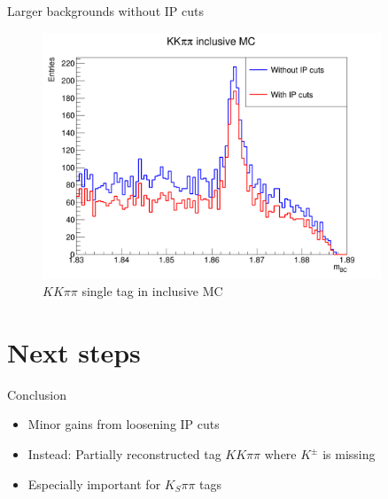 \documentclass{beamer}
\begin{document}
\begin{frame}{Larger backgrounds without IP cuts}
  \begin{figure}
    \centering
    \includegraphics[width=0.9\textwidth]{Plots/InclusiveMC_IPcuts.png}
    \caption{$KK\pi\pi$ single tag in inclusive MC}
  \end{figure}
\end{frame}

\section{Next steps}
\begin{frame}{Conclusion}
  \begin{itemize}
    \setlength\itemsep{1.5em}
    \item{Minor gains from loosening IP cuts}
    \item{Instead: Partially reconstructed tag $KK\pi\pi$ where $K^\pm$ is missing}
    \item{Especially important for $K_S\pi\pi$ tags}
  \end{itemize}
\end{frame}
\end{document}

